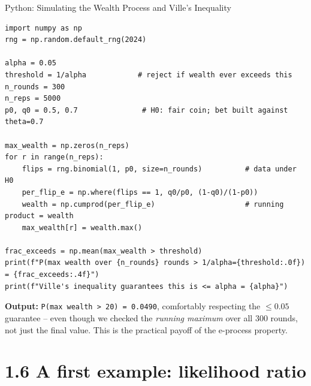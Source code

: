 \documentclass[aspectratio=169,10pt]{beamer}
\begin{document}
\begin{frame}[fragile]{Python: Simulating the Wealth Process and Ville's Inequality}

\begin{lstlisting}
import numpy as np
rng = np.random.default_rng(2024)

alpha = 0.05
threshold = 1/alpha            # reject if wealth ever exceeds this
n_rounds = 300
n_reps = 5000
p0, q0 = 0.5, 0.7               # H0: fair coin; bet built against theta=0.7

max_wealth = np.zeros(n_reps)
for r in range(n_reps):
    flips = rng.binomial(1, p0, size=n_rounds)          # data under H0
    per_flip_e = np.where(flips == 1, q0/p0, (1-q0)/(1-p0))
    wealth = np.cumprod(per_flip_e)                     # running product = wealth
    max_wealth[r] = wealth.max()

frac_exceeds = np.mean(max_wealth > threshold)
print(f"P(max wealth over {n_rounds} rounds > 1/alpha={threshold:.0f}) = {frac_exceeds:.4f}")
print(f"Ville's inequality guarantees this is <= alpha = {alpha}")
\end{lstlisting}

\medskip
\textbf{Output:} \texttt{P(max wealth > 20) = 0.0490}, comfortably
respecting the $\le 0.05$ guarantee -- even though we checked the
\emph{running maximum} over all 300 rounds, not just the final value.
This is the practical payoff of the e-process property.

\end{frame}

\section{1.6 A first example: likelihood ratio}
\end{document}
